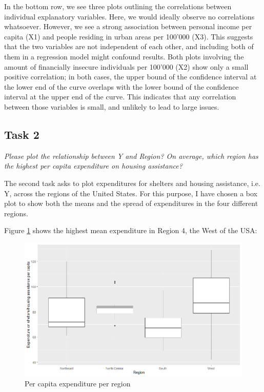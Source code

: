 \documentclass[12pt,a4paper]{article}
\begin{document}
In the bottom row, we see three plots outlining the correlations between individual explanatory variables. Here, we would ideally observe no correlations whatsoever. However, we see a strong association between personal income per capita (X1) and people residing in urban areas per 100’000 (X3). This suggests that the two variables are not independent of each other, and including both of them in a regression model might confound results. Both plots involving the amount of financially insecure individuals per 100’000 (X2) show only a small positive correlation; in both cases, the upper bound of the confidence interval at the lower end of the curve overlaps with the lower bound of the confidence interval at the upper end of the curve. This indicates that any correlation between those variables is small, and unlikely to lead to large issues.

\subsection{Task 2}
\textit{Please plot the relationship between \emph{Y} and \emph{Region}? On average, which region has the highest per capita expenditure on housing assistance?}
\vspace{0.5cm}

The second task asks to plot expenditures for shelters and housing assistance, i.e. Y, across the regions of the United States. For this purpose, I have chosen a box plot to show both the means and the spread of expenditures in the four different regions. 



Figure \ref{fig:regionplot} shows the highest mean expenditure in Region 4, the West of the USA:

\begin{figure}[h]
	\centering
	\includegraphics[width=\textwidth]{PS1_Plot2}
	\caption{Per capita expenditure per region}
	\label{fig:regionplot}
\end{figure}
\end{document}
